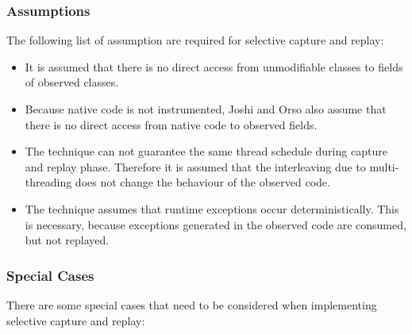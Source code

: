 \subsubsection{Assumptions}
The following list of assumption are required for selective capture and replay:
\begin{itemize}
 \item It is assumed that there is no direct access from unmodifiable classes to fields of observed classes.
 \item Because native code is not instrumented, Joshi and Orso also assume that there is no direct access from native code to observed fields.
 \item The technique can not guarantee the same thread schedule during capture and replay phase. Therefore it is assumed that the interleaving due to multi-threading does not change the behaviour of the observed code.
 \item The technique assumes that runtime exceptions occur deterministically. This is necessary, because exceptions generated in the observed code are consumed, but not replayed.
\end{itemize}

\subsubsection{Special Cases}
There are some special cases that need to be considered when implementing selective capture and replay:

